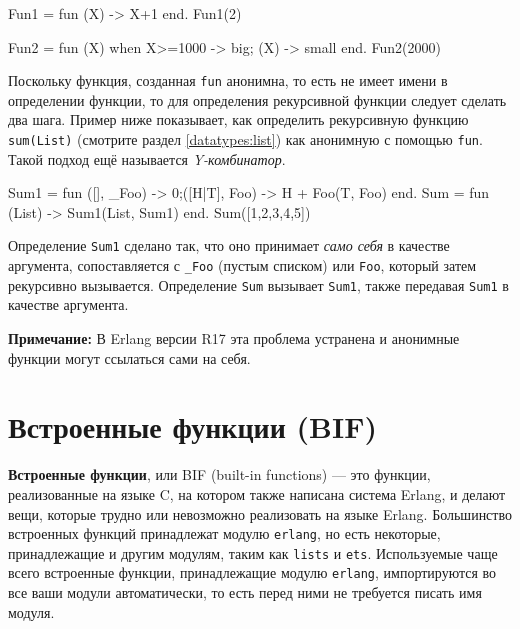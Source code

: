 \pagebreak
\begin{erlang}
Fun1 = fun (X) -> X+1 end.
Fun1(2)         %

Fun2 = fun (X) when X>=1000 -> big; (X) -> small end.
Fun2(2000)      %
\end{erlang}

Поскольку функция, созданная  \texttt{fun} анонимна, то есть не имеет имени в 
определении функции, то для определения рекурсивной функции следует сделать два
шага.  Пример ниже показывает, как определить рекурсивную функцию 
\texttt{sum(List)} (смотрите раздел \ref{datatypes:list}) как анонимную с 
помощью \texttt{fun}. Такой подход ещё называется \emph{Y-комбинатор}.

\begin{erlang}
Sum1 = fun ([], _Foo) -> 0;([H|T], Foo) -> H + Foo(T, Foo) end.
Sum = fun (List) -> Sum1(List, Sum1) end.
Sum([1,2,3,4,5])    %
\end{erlang}

Определение \texttt{Sum1} сделано так, что оно принимает \emph{само себя} в
качестве аргумента, сопоставляется с \texttt{\_Foo} (пустым списком) или
\texttt{Foo}, который затем рекурсивно вызывается.  Определение \texttt{Sum} 
вызывает \texttt{Sum1}, также передавая \texttt{Sum1} в качестве аргумента.

\textbf{Примечание:} В Erlang версии R17 эта проблема устранена и анонимные 
функции могут ссылаться сами на себя.



\section{Встроенные функции (BIF)}
\label{functions:bifs}

\textbf{Встроенные функции}, или BIF (built-in functions) --- это функции, 
реализованные на языке C, на котором также написана система Erlang, и делают 
вещи, которые трудно или невозможно реализовать на языке Erlang.  Большинство
встроенных функций принадлежат модулю \texttt{erlang}, но есть некоторые,
принадлежащие и другим модулям, таким как \texttt{lists} и \texttt{ets}. 
Используемые чаще всего встроенные функции, принадлежащие модулю 
\texttt{erlang}, импортируются во все ваши модули автоматически, то есть перед
ними не требуется писать имя модуля.

